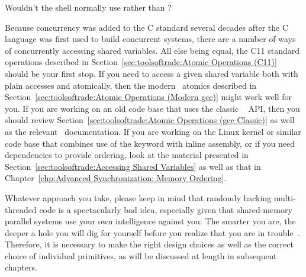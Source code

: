 \QuickQuiz{}
	Wouldn't the shell normally use  rather than
	?
 \QuickQuizEnd

Because concurrency was added to the C standard several decades after
the C language was first used to build concurrent systems, there are
a number of ways of concurrently accessing shared variables.
All else being equal, the C11 standard operations described in
Section~\ref{sec:toolsoftrade:Atomic Operations (C11)}
should be your first stop.
If you need to access a given shared variable both with plain accesses
and atomically, then the modern \GCC\ atomics described in
Section~\ref{sec:toolsoftrade:Atomic Operations (Modern gcc)}
might work well for you.
If you are working on an old code base that uses the classic \GCC\ 
API, then you should review
Section~\ref{sec:toolsoftrade:Atomic Operations (gcc Classic)}
as well as the relevant \GCC\ documentation.
If you are working on the Linux kernel or similar code base that
combines use of the  keyword with inline assembly,
or if you need dependencies to provide ordering, look at the material
presented in Section~\ref{sec:toolsoftrade:Accessing Shared Variables}
as well as that in
Chapter~\ref{chp:Advanced Synchronization: Memory Ordering}.

Whatever approach you take, please keep in mind that randomly hacking
multi-threaded code is a spectacularly bad idea, especially given that
shared-memory parallel systems use your own intelligence against you:
The smarter you are, the deeper a hole you will dig for yourself before
you realize that you are in trouble~\cite{DeadlockEmpire2016}.
Therefore, it is necessary to make the right design choices as well as
the correct choice of individual primitives,
as will be discussed at length in subsequent chapters.
